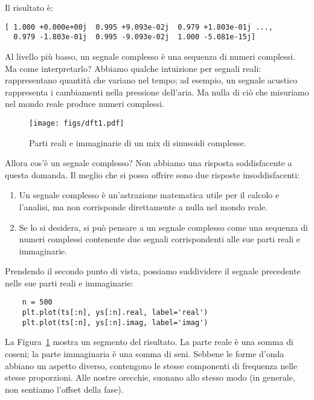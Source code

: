\documentclass[12pt]{book} \usepackage[width=5.5in,height=8.5in, hmarginratio=3:2,vmarginratio=1:1]{geometry}
\begin{document}
Il risultato è:

\begin{verbatim} 
[ 1.000 +0.000e+00j  0.995 +9.093e-02j  0.979 +1.803e-01j ...,
  0.979 -1.803e-01j  0.995 -9.093e-02j  1.000 -5.081e-15j]
 \end{verbatim} 

Al livello più basso, un segnale complesso è una sequenza di numeri complessi. Ma come interpretarlo? Abbiamo qualche intuizione per segnali reali: rappresentano quantità che variano nel tempo; ad esempio, un segnale acustico rappresenta i cambiamenti nella pressione dell'aria. Ma nulla di ciò che misuriamo nel mondo reale produce numeri complessi.

\begin{figure} 

\centerline{\texttt{[image: figs/dft1.pdf]}} \caption{Parti reali e immaginarie di un mix di sinusoidi complesse.} \label{fig.dft1} \end{figure} 

Allora cos'è un segnale complesso? Non abbiamo una risposta soddisfacente a questa domanda. Il meglio che si possa offrire sono due risposte insoddisfacenti:

\begin{enumerate} 

\item Un segnale complesso è un'astrazione matematica utile per il calcolo e l'analisi, ma non corrisponde direttamente a nulla nel mondo reale.

\item Se lo si desidera, si può pensare a un segnale complesso come una sequenza di numeri complessi contenente due segnali corrispondenti alle sue parti reali e immaginarie.

\end{enumerate} 

Prendendo il secondo punto di vista, possiamo suddividere il segnale precedente nelle sue parti reali e immaginarie:

\begin{verbatim} 
    n = 500
    plt.plot(ts[:n], ys[:n].real, label='real')
    plt.plot(ts[:n], ys[:n].imag, label='imag')
 \end{verbatim} 

La Figura~\ref{fig.dft1} mostra un segmento del risultato. La parte reale è una somma di coseni; la parte immaginaria è una somma di seni. Sebbene le forme d'onda abbiano un aspetto diverso, contengono le stesse componenti di frequenza nelle stesse proporzioni. Alle nostre orecchie, suonano allo stesso modo (in generale, non sentiamo l'offset della fase).
\end{document}

